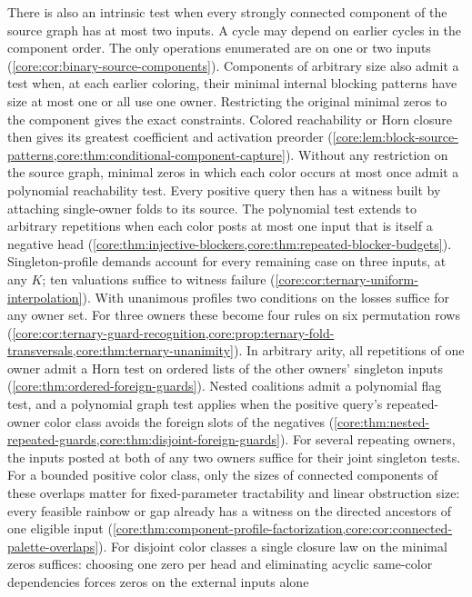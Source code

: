 There is also an intrinsic test when every strongly connected component
of the source graph has at most two inputs. A cycle may depend on earlier cycles
in the component order. The only operations enumerated
are on one or two inputs (\cref{core:cor:binary-source-components}).
Components of arbitrary size also admit a test when, at each earlier
coloring, their minimal internal blocking patterns have size at most
one or all use one owner. Restricting the original minimal zeros to
the component gives the exact constraints. Colored reachability or
Horn closure then gives its greatest coefficient and activation
preorder (\cref{core:lem:block-source-patterns,core:thm:conditional-component-capture}).
Without any restriction on the source graph, minimal zeros in which
each color occurs at most once admit a polynomial reachability test.
Every positive query then has a witness built by attaching single-owner
folds to its source. The polynomial test extends to arbitrary repetitions
when each color posts at most one input that is itself a negative head
(\cref{core:thm:injective-blockers,core:thm:repeated-blocker-budgets}). Singleton-profile
demands account for every remaining case on three inputs, at any $K$;
ten valuations suffice to witness failure
(\cref{core:cor:ternary-uniform-interpolation}). With unanimous profiles
two conditions on the losses suffice for any owner set. For three owners
these become four rules on six permutation rows
(\cref{core:cor:ternary-guard-recognition,core:prop:ternary-fold-transversals,core:thm:ternary-unanimity}).
In arbitrary arity, all repetitions of one owner admit a Horn test on
ordered lists of the other owners' singleton inputs
(\cref{core:thm:ordered-foreign-guards}). Nested coalitions admit a
polynomial flag test, and a polynomial graph test applies when the
positive query's repeated-owner color class avoids the foreign slots
of the negatives
(\cref{core:thm:nested-repeated-guards,core:thm:disjoint-foreign-guards}).
For several repeating owners, the inputs posted at both of any two
owners suffice for their joint singleton tests. For a bounded positive color class, only the sizes of connected
components of these overlaps matter for fixed-parameter tractability
and linear obstruction size: every feasible rainbow or gap already has
a witness on the directed ancestors of one eligible input
(\cref{core:thm:component-profile-factorization,core:cor:connected-palette-overlaps}). For disjoint color classes a single closure law on the minimal
zeros suffices: choosing one zero per head and eliminating acyclic
same-color dependencies forces zeros on the external inputs alone
